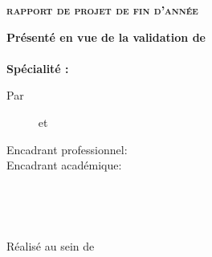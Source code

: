 \begin{center}
{\LARGE{\textbf{\textsc{rapport de projet de fin d'année}}}}\\
\vskip0.5cm
\large

{\textbf{Présenté en vue de la validation de }}\\
\vskip2mm
{\textbf{\@diplomaName}}\\
{\textbf{Spécialité : \@speciality}}\\
{}
\end{center}

\begin{center}
\textrm{Par}\\
\vskip0.3cm
{
    {%
        \begin{center}
            \large\textbf{\@author}~~~~~ et ~~~~~
            \large\textbf{\@secondAuthor}
        \end{center}
    }
    {\Large\textbf{\@author}}%
}
\vskip12mm

\begin{changemargin}{-9mm}{0cm}
\begin{minipage}[l]{1.1\columnwidth}
\begin{tcolorbox}[colback=white,boxrule=0pt,toprule=3pt,bottomrule=3pt,arc=0pt,top=0mm,right=0mm,left=0mm,bottom=0mm,boxsep=0.5mm]{
    \begin{tcolorbox}[colback=white, boxrule=0pt,toprule=1pt,bottomrule=1pt,arc=0pt,enlarge bottom by=-0.9mm, auto outer arc]
        \centering
        {\huge\textbf{\@title}}
    \end{tcolorbox}
}
\end{tcolorbox}
\end{minipage}
\end{changemargin}

\end{center}
\vskip8mm%

\begin{center}
\large
\begin{minipage}[c]{0.28\columnwidth}
Encadrant professionnel:\\
\newline
\newline
Encadrant académique:
\end{minipage}
\hfill
\begin{minipage}[c]{0.42\columnwidth}
\textbf{\@proFramerName}\\
\newline
\newline
\textbf{\@academicFramerName}
\end{minipage}
\hfill
\begin{minipage}[c]{0.26\columnwidth}
    \vspace{-2mm}

\@proFramerSpeciality\\
\@academicFramerSpeciality
\end{minipage}
\end{center}
\vskip16mm

\begin{center}
\large
Réalisé au sein de \@companyName\\
\vskip0.4cm
\begin{figure}[h]
\centering
{{\fboxrule=2.5pt}}
\end{figure}
\end{center}

\restoregeometry